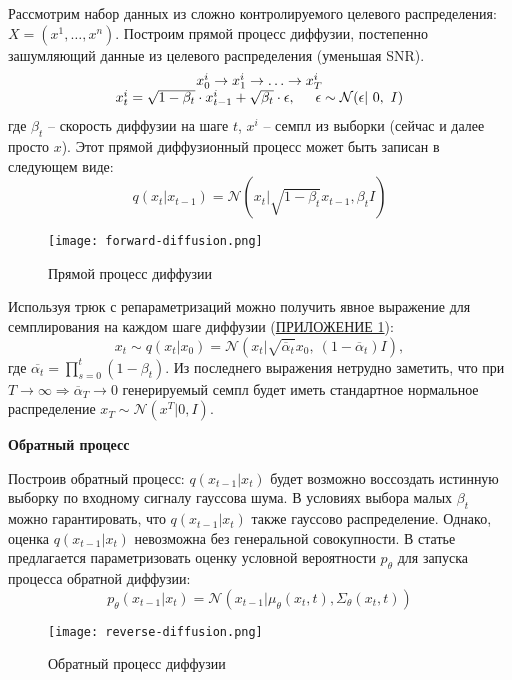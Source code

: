\par
Рассмотрим набор данных из сложно контролируемого целевого распределения: $X = (x^1, \ldots, x^n)$. Построим прямой процесс диффузии, постепенно зашумляющий данные из целевого распределения (уменьшая SNR).
\[
    \begin{array}{c}
        x^i_0 \to x^i_1 \to \ldots \to x^i_T\\
        x^i_{t} = \sqrt{1-\beta_t}\cdot x^i_{t-1} + \sqrt{\beta_t}\cdot \epsilon, \hspace*{0.5cm} \epsilon \sim \mathcal{N}(\epsilon| \ 0, \ I)
    \end{array}
\]
где $\beta_t$ -- скорость диффузии на шаге $t$, $x^i$ -- семпл из выборки (сейчас и далее просто $x$). Этот прямой диффузионный процесс может быть записан в следующем виде:
\begin{equation}
    q(x_{t}|x_{t-1}) = \mathcal{N}(x_{t} \vert \sqrt{1 - \beta_t}x_{t-1}, \beta_t I)
    \label{eq:forward_process}
\end{equation}
\begin{figure}[H]
    \centering
    \texttt{[image: forward-diffusion.png]}
    \caption{Прямой процесс диффузии \cite{ho2020denoising}}
    \label{fig:forward_process}
\end{figure}
Используя трюк с репараметризаций можно получить явное выражение для семплирования на каждом шаге диффузии (\hyperref[AppendixA]{ПРИЛОЖЕНИЕ 1}):
\begin{equation}
    x_t \sim q(x_t| x_0) = \mathcal{N}(x_t\vert \sqrt{\overline{\alpha}_t} x_0, \ (1 - \overline{\alpha}_t)I),    
    \label{eq:any_step}
\end{equation}
где $\overline{\alpha_t} = \prod_{s=0}^{t} (1 - \beta_t)$. Из последнего выражения нетрудно заметить, что при $T \to \infty \Longrightarrow \overline{\alpha}_T \to 0$  генерируемый семпл будет иметь стандартное нормальное распределение $x_T \sim \mathcal{N}(x^T\vert 0, I)$. 

\textbf{Обратный процесс}

Построив обратный процесс: $q(x_{t-1}\vert x_t)$ будет возможно воссоздать истинную выборку по входному сигналу гауссова шума. В условиях выбора малых $\beta_t$ можно гарантировать, что $q(x_{t-1}| x_t)$ также гауссово распределение. Однако, оценка $q(x_{t-1}\vert x_t)$ невозможна без генеральной совокупности. В статье \cite{sohldickstein2015deep} предлагается параметризовать оценку условной вероятности $p_\theta$ для запуска процесса обратной диффузии: 
\begin{equation}
    p_\theta(x_{t-1}\vert x_t) = \mathcal{N}(x_{t-1}\vert \mu_\theta(x_t, t), \Sigma_\theta(x_t, t))    
\end{equation}
\begin{figure}[H]
    \centering
    \texttt{[image: reverse-diffusion.png]}
    \caption{Обратный процесс диффузии \cite{ho2020denoising}}
    \label{fig:reverse_process}
\end{figure}

